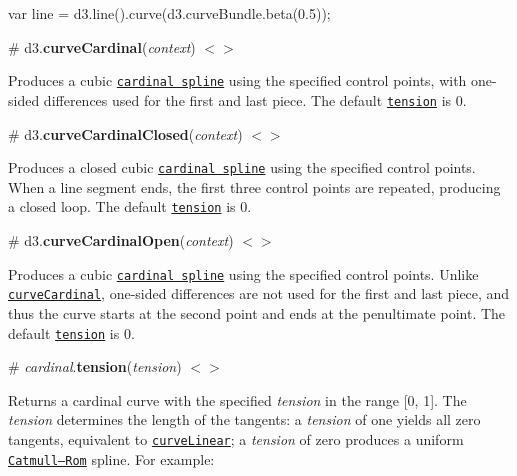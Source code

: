 \begin{DoxyCode}
var line = d3.line().curve(d3.curveBundle.beta(0.5));
\end{DoxyCode}


\label{_curveCardinal}%
\# d3.{\bfseries curve\+Cardinal}({\itshape context}) \href{https://github.com/d3/d3-shape/blob/master/src/curve/cardinal.js}{\tt $<$$>$}



Produces a cubic \href{https://en.wikipedia.org/wiki/Cubic_Hermite_spline#Cardinal_spline}{\tt cardinal spline} using the specified control points, with one-\/sided differences used for the first and last piece. The default \href{#curveCardinal_tension}{\tt tension} is 0.

\label{_curveCardinalClosed}%
\# d3.{\bfseries curve\+Cardinal\+Closed}({\itshape context}) \href{https://github.com/d3/d3-shape/blob/master/src/curve/cardinalClosed.js}{\tt $<$$>$}



Produces a closed cubic \href{https://en.wikipedia.org/wiki/Cubic_Hermite_spline#Cardinal_spline}{\tt cardinal spline} using the specified control points. When a line segment ends, the first three control points are repeated, producing a closed loop. The default \href{#curveCardinal_tension}{\tt tension} is 0.

\label{_curveCardinalOpen}%
\# d3.{\bfseries curve\+Cardinal\+Open}({\itshape context}) \href{https://github.com/d3/d3-shape/blob/master/src/curve/cardinalOpen.js}{\tt $<$$>$}



Produces a cubic \href{https://en.wikipedia.org/wiki/Cubic_Hermite_spline#Cardinal_spline}{\tt cardinal spline} using the specified control points. Unlike \href{#curveCardinal}{\tt curve\+Cardinal}, one-\/sided differences are not used for the first and last piece, and thus the curve starts at the second point and ends at the penultimate point. The default \href{#curveCardinal_tension}{\tt tension} is 0.

\label{_curveCardinal_tension}%
\# {\itshape cardinal}.{\bfseries tension}({\itshape tension}) \href{https://github.com/d3/d3-shape/blob/master/src/curve/cardinalOpen.js#L44}{\tt $<$$>$}

Returns a cardinal curve with the specified {\itshape tension} in the range \mbox{[}0, 1\mbox{]}. The {\itshape tension} determines the length of the tangents\+: a {\itshape tension} of one yields all zero tangents, equivalent to \href{#curveLinear}{\tt curve\+Linear}; a {\itshape tension} of zero produces a uniform \href{#curveCatmullRom}{\tt Catmull–\+Rom} spline. For example\+:


